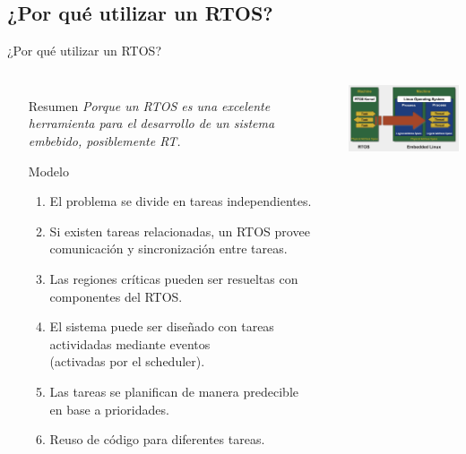 \documentclass[8pt,aspectratio=169,compress]{beamer}
\begin{document}
\subsection{¿Por qué utilizar un RTOS?}


\begin{frame}{¿Por qué utilizar un RTOS?}

    \begin{columns}[onlytextwidth,T]
      \column{\dimexpr\linewidth-60mm-5mm}

\begin{itemize}
\item [Resumen] \textit{Porque un RTOS es una excelente herramienta para el desarrollo de un sistema embebido, posiblemente RT.}

\bigskip
\bigskip
\item [Modelo]

\begin{enumerate}
\item El problema se divide en tareas independientes.
\item Si existen tareas relacionadas, un RTOS provee comunicación y sincronización entre tareas.
\item Las regiones críticas pueden ser resueltas con componentes del RTOS.
\item El sistema puede ser diseñado con tareas actividadas mediante eventos \\ (activadas por el scheduler).
\item Las tareas se planifican de manera predecible \\ en base a prioridades.
\item Reuso de código para diferentes tareas.
\end{enumerate}

\end{itemize}

      \column{70mm}
     \includegraphics[width=70mm]{images/rtos-vs-linux.jpg}

    \end{columns}
\end{frame}
\end{document}
